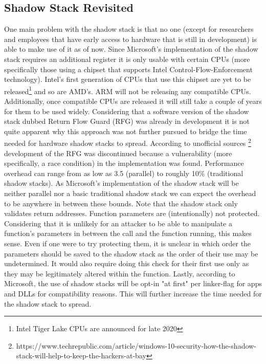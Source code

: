 \documentclass[10pt,twocolumn,a4paper]{article}
\begin{document}
\subsection{Shadow Stack Revisited}
One main problem with the shadow stack is that no one (except for researchers and employees that have early access to hardware that is still in development) is able to make use of it as of now. Since Microsoft's implementation of the shadow stack requires an additional register it is only usable with certain CPUs (more specifically those using a chipset that supports Intel Control-Flow-Enforcement technology)\cite{CFE}.
Intel's first generation of CPUs that use this chipset are yet to be released\footnote{Intel Tiger Lake CPUs are announced for late 2020} and so are AMD's.
\newline ARM will not be releasing any compatible CPUs\cite{techrepublic}.
Additionally, once compatible CPUs are released it will still take a couple of years for them to be used widely.
Considering that a software version of the shadow stack dubbed Return Flow Guard (RFG)\cite{RFG} was already in development it is not quite apparent why this approach was not further pursued to bridge the time needed for hardware shadow stacks to spread.
According to unofficial sources \footnote{https://www.techrepublic.com/article/windows-10-security-how-the-shadow-stack-will-help-to-keep-the-hackers-at-bay} development of the RFG was discontinued because a vulnerability (more specifically, a race condition) in the implementation was found.
Performance overhead can range from as low as 3.5 (parallel) to roughly 10\% (traditional shadow stacks)\cite{performance}. As Microsoft's implementation of the shadow stack will  be neither parallel nor a basic traditional shadow stack we can expect the overhead to be anywhere in between these bounds.
Note that the shadow stack only validates return addresses. Function parameters are (intentionally) not protected.
Considering that it is unlikely for an attacker to be able to manipulate a function's parameters in between the call and the function running, this makes sense. Even if one were to try protecting them, it is unclear in which order the parameters should be saved to the shadow stack as the order of their use may be undetermined. It would also require doing this check for their first use only as they may be legitimately altered within the function.
Lastly, according to Microsoft, the use of shadow stacks will be opt-in "at first" per linker-flag for apps and DLLs for compatibility reasons. This will further increase the time needed for the shadow stack to spread\cite{SS}.
\end{document}
